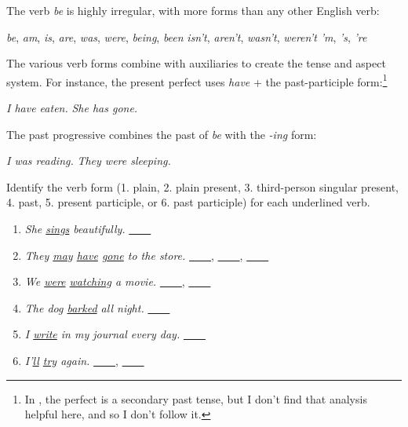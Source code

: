 The verb \textit{be} is highly irregular, with more forms than any other English verb:

\ea
\ea \textit{be}, \textit{am}, \textit{is}, \textit{are}, \textit{was}, \textit{were}, \textit{being}, \textit{been}
\ex \textit{isn't}, \textit{aren't}, \textit{wasn't}, \textit{weren't}
\ex \textit{'m}, \textit{'s}, \textit{'re}
\z\z

The various verb forms combine with auxiliaries to create the tense and aspect system. For instance, the present perfect uses \textit{have} + the past-participle form:\footnote{In \cite{Huddleston2002}, the perfect is a secondary past tense, but I don't find that analysis helpful here, and so I don't follow it.}

\ea \textit{I have eaten.}
\ex \textit{She has gone.}
\z

The past progressive combines the past of \textit{be} with the \textit{-ing} form:

\ea \textit{I was reading.}
\ex \textit{They were sleeping.}
\z{}

\begin{tcolorbox}[title=Exercise: Verb Forms, colback=white, colframe=red!75!black, fonttitle=\bfseries]
Identify the verb form (1. plain, 2. plain present, 3. third-person singular present, 4. past, 5. present participle, or 6. past participle) for each underlined verb.

\begin{enumerate}[nosep]
    \item \textit{She \uline{sings} beautifully.} \hfill\uline{~~~~}
    \item \textit{They \uline{may} \uline{have} \uline{gone} to the store.} \hfill\uline{~~~~},  \uline{~~~~},  \uline{~~~~}
    \item \textit{We \uline{were} \uline{watching} a movie.} \hfill\uline{~~~~},  \uline{~~~~}
    \item \textit{The dog \uline{barked} all night.} \hfill\uline{~~~~}
    \item \textit{I \uline{write} in my journal every day.} \hfill\uline{~~~~}
    \item \textit{I'\uline{ll} \uline{try} again.} \hfill\uline{~~~~},  \uline{~~~~}
\end{enumerate}
\end{tcolorbox}

